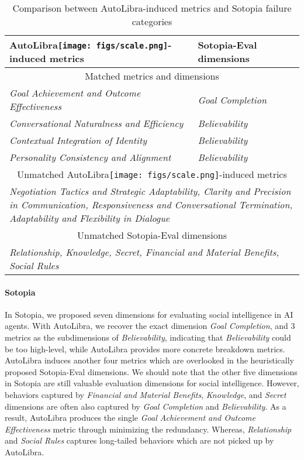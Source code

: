 \begin{table}[!h]
\centering
\begin{tabular}{ll}
    \toprule
    AutoLibra\protect\texttt{[image: figs/scale.png]}-induced metrics & Sotopia-Eval dimensions\\
    \midrule
    \multicolumn{2}{c}{Matched metrics and dimensions}\\\midrule
    \textit{Goal Achievement and Outcome Effectiveness} & \textit{Goal Completion}\\
    \textit{Conversational Naturalness and Efficiency} & \textit{Believability} \\
    \textit{Contextual Integration of Identity} & \textit{Believability}\\
    \textit{Personality Consistency and Alignment} & \textit{Believability}\\ \midrule
    \multicolumn{2}{c}{Unmatched AutoLibra\protect\texttt{[image: figs/scale.png]}-induced metrics}\\\midrule
     \multicolumn{2}{C{0.8\textwidth}}{\textit{Negotiation Tactics and Strategic Adaptability, Clarity and Precision in Communication, Responsiveness and Conversational Termination, Adaptability and Flexibility in Dialogue}} \\ \midrule
     \multicolumn{2}{c}{Unmatched Sotopia-Eval dimensions}\\\midrule
     \multicolumn{2}{C{0.8\textwidth}}{\textit{Relationship, Knowledge, Secret, Financial and Material Benefits, Social Rules}} \\\bottomrule
\end{tabular}
\caption{Comparison between AutoLibra-induced metrics and Sotopia failure categories }
\label{tab:lens_sotopia}
\end{table}

\paragraph{Sotopia} In Sotopia, we \citep{zhousotopia} proposed seven dimensions for evaluating social intelligence in AI agents. With AutoLibra, we recover the exact dimension \emph{Goal Completion}, and 3 metrics as the subdimensions of \emph{Believability}, indicating that \textit{Believability} could be too high-level, while AutoLibra provides more concrete breakdown metrics. 
AutoLibra induces another four metrics which are overlooked in the heuristically proposed Sotopia-Eval dimensions. We should note that the other five dimensions in Sotopia are still valuable evaluation dimensions for social intelligence. However, behaviors captured by \emph{Financial and Material Benefits}, \emph{Knowledge}, and \emph{Secret} dimensions are often also captured by \textit{Goal Completion} and \textit{Believability}. As a result, AutoLibra produces the single \textit{Goal Achievement and Outcome Effectiveness} metric through minimizing the redundancy. Whereas, \textit{Relationship} and \textit{Social Rules} captures long-tailed behaviors which are not picked up by AutoLibra.

